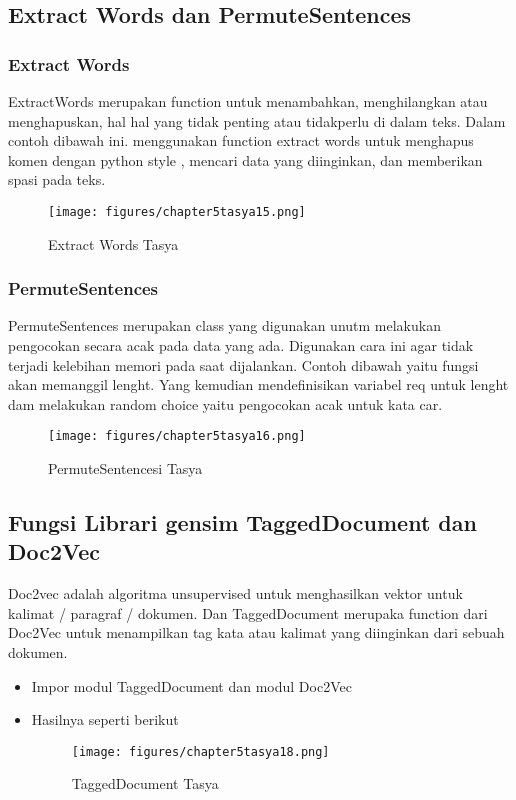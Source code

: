 \subsection{Extract Words dan PermuteSentences}
\subsubsection{Extract Words}
ExtractWords merupakan function untuk menambahkan, menghilangkan atau menghapuskan, hal hal yang tidak penting atau tidakperlu di dalam teks. Dalam contoh dibawah ini. menggunakan function extract words untuk menghapus komen dengan python style , mencari data yang diinginkan, dan memberikan spasi pada teks.
\begin{figure}[ht]
\centering
\texttt{[image: figures/chapter5tasya15.png]}
\caption{Extract Words Tasya}
\label{Praktek}
\end{figure}

\subsubsection{PermuteSentences}
PermuteSentences merupakan class yang digunakan unutm melakukan pengocokan secara acak pada data yang ada. Digunakan cara ini agar tidak terjadi kelebihan memori pada saat dijalankan. Contoh dibawah yaitu fungsi akan memanggil lenght. Yang kemudian mendefinisikan variabel req untuk lenght dam melakukan random choice yaitu pengocokan acak untuk kata car.
\begin{figure}[ht]
\centering
\texttt{[image: figures/chapter5tasya16.png]}
\caption{PermuteSentencesi Tasya}
\label{Praktek}
\end{figure}

\subsection{Fungsi Librari gensim TaggedDocument dan Doc2Vec}
Doc2vec adalah algoritma unsupervised untuk menghasilkan vektor untuk kalimat / paragraf / dokumen. Dan TaggedDocument merupaka function dari Doc2Vec untuk menampilkan tag kata atau kalimat yang diinginkan dari sebuah dokumen.

\begin{itemize}
\item Impor modul TaggedDocument dan modul Doc2Vec
\item Hasilnya seperti berikut
\begin{figure}[ht]
\centering
\texttt{[image: figures/chapter5tasya18.png]}
\caption{TaggedDocument Tasya }
\label{Praktek}
\end{figure}
\end{itemize}


